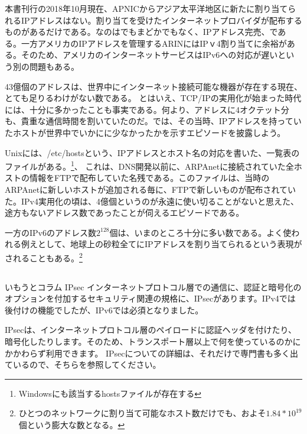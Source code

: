 本書刊行の2018年10月現在、APNICからアジア太平洋地区に新たに割り当てられるIPアドレスはない。割り当てを受けたインターネットプロバイダが配布するものがあるだけである。なのはでもまどかでもなく、IPアドレス完売、である。一方アメリカのIPアドレスを管理するARINにはIPｖ4割り当てに余裕がある。そのため、アメリカのインターネットサービスはIPv6への対応が遅いという別の問題もある。

43億個のアドレスは、世界中にインターネット接続可能な機器が存在する現在、とても足りるわけがない数である。
とはいえ、TCP/IPの実用化が始まった時代には、十分に多かったことも事実である。何より、アドレスに4オクテット分も、貴重な通信時間を割いていたのだ。では、その当時、IPアドレスを持っていたホストが世界中でいかにに少なかったかを示すエピソードを披露しよう。

Unixには、/etc/hostsという、IPアドレスとホスト名の対応を書いた、一覧表のファイルがある。\footnote{Windowsにも該当するhostsファイルが存在する}、
これは、DNS開発以前に、ARPAnetに接続されていた全ホストの情報をFTPで配布していた名残である。このファイルは、当時のARPAnetに新しいホストが追加される毎に、FTPで新しいものが配布されていた。IPv4実用化の頃は、4億個というのが永遠に使い切ることがないと思えた、途方もないアドレス数であったことが伺えるエピソードである。

一方のIPv6のアドレス数$2^{128}$個は、いまのところ十分に多い数である。よく使われる例えとして、地球上の砂粒全てにIPアドレスを割り当てられるという表現がされることもある。\footnote{ひとつのネットワークに割り当て可能なホスト数だけでも、およそ$1.84*10^{19}$個という膨大な数となる。}

\subsection*{}
\begin{itembox}[l]{いもうとコラム IPsec}
インターネットプロトコル層での通信に、認証と暗号化のオプションを付加するセキュリティ関連の規格に、IPsecがあります。IPv4では後付けの機能でしたが、IPv6では必須となりました。

IPsecは、インターネットプロトコル層のペイロードに認証ヘッダを付けたり、暗号化したりします。そのため、トランスポート層以上で何を使っているのかにかかわらず利用できます。
IPsecについての詳細は、それだけで専門書も多く出ているので、そちらを参照してください。


\end{itembox}